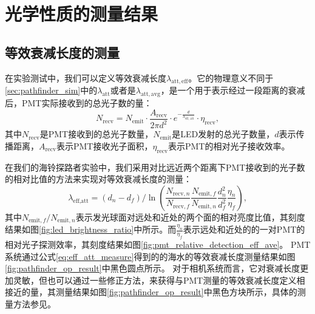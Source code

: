 \section{光学性质的测量结果}

\subsection{等效衰减长度的测量}

在实验测试中，我们可以定义等效衰减长度$\lambda_\mathrm{att,eff}$。它的物理意义不同于\ref{sec:pathfinder_sim}中的$\lambda_\mathrm{att}$或者是$\lambda_\mathrm{att,avg}$，是一个用于表示经过一段距离的衰减后，PMT实际接收到的总光子数的量：
\begin{equation}
    N_{\text{recv}} = N_{\text{emit}} \cdot \frac{A_{\text{recv}}}{2\pi d^{2}} \cdot e^{-\frac{d}{\lambda_{\text{eff, att}}}} \cdot \eta_{\text{recv}} ,
    \label{eq:eff_att}
\end{equation}
其中$N_{\text{recv}}$是PMT接收到的总光子数量，$N_{\text{emit}}$是LED发射的总光子数量，$d$表示传播距离，$A_{\text{recv}}$表示PMT接收光子面积，$\eta_{\text{recv}}$表示PMT的相对光子接收效率。

在我们的海铃探路者实验中，我们采用对比远近两个距离下PMT接收到的光子数的相对比值的方法来实现对等效衰减长度的测量：
\begin{equation}
   \lambda_{\text{eff,att}} = (d_n - d_f) /\ln{(\frac{N_{\text{recv},n}}{N_{\text{recv},f}} \frac{N_{\text{emit},f}}{N_{\text{emit},n}} \frac{d_n^2}{d_f^2} \frac{\eta_n}{\eta_f})},
   \label{eq:eff_att_measure}
\end{equation}
其中$N_{\text{emit},f}/N_{\text{emit},n}$表示发光球面对远处和近处的两个面的相对亮度比值，其刻度结果如图\ref{fig:led_brightness_ratio}中所示。而$\frac{\eta_n}{\eta_f}$表示远处和近处的的一对PMT的相对光子探测效率，其刻度结果如图\ref{fig:pmt_relative_detection_eff_ave}。
PMT系统通过公式\ref{eq:eff_att_measure}得到的的海水的等效衰减长度测量结果如图\ref{fig:pathfinder_op_result}中黑色圆点所示。
对于相机系统而言，它对衰减长度更加灵敏，但也可以通过一些修正方法，来获得与PMT测量的等效衰减长度定义相接近的量，其测量结果如图\ref{fig:pathfinder_op_result}中黑色方块所示，具体的测量方法参见\cite{pathfinder_camera:2022}。

